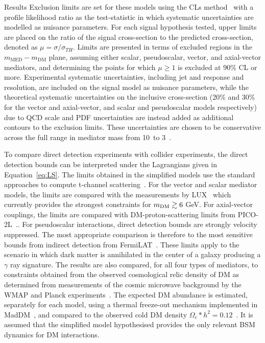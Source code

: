 \begin{section}{Results}
Exclusion limits are set for these models using the CLs method~\cite{cls} with a profile likelihood ratio as the 
test-statistic in which systematic uncertainties are modelled as nuisance parameters. 
For each signal hypothesis tested, upper limits are placed on the ratio of 
the signal cross-section to the predicted cross-section, denoted as $\mu=\sigma/\sigma_{TH}$. Limits are presented in terms of excluded regions in the 
$m_{\mathrm{MED}}-m_{\textrm{DM}}$ plane, assuming either scalar,
pseudoscalar, vector, and axial-vector mediators, and determining the points for which $\mu\ge1$ is excluded at 90\% CL or more.
Experimental systematic uncertainties, including jet and \ETm response and resolution, are included on the signal model as nuisance parameters, while the
theoretical systematic uncertainties on the inclusive cross-section (20\% and 30\% for the vector and axial-vector, and scalar and pseudoscalar models respectively) due to QCD scale and 
PDF uncertainties are instead added as additional contours to the
exclusion limits. These uncertainties are chosen to be conservative
across the full range in mediator mass from 10~\GeV to 3~\TeV.

To compare direct detection experiments with collider experiments, the direct detection bounds can be interpreted under the Lagrangians given in Equation~\ref{eq:LS}. The limits obtained in 
the simplified models use the standard approaches to compute t-channel scattering~\cite{Kurylov:2003ra,Hisano:2010ct, Cheung:2013pfa,Buchmueller:2014yoa}. 
For the vector and scalar mediator models, the limits are compared with the measurements by LUX~\cite{Akerib:2012ys,Akerib:2013tjd,Szydagis:2014xog} which currently 
provides the strongest constraints for $m_{\rm{DM}} \gtrsim 6$ GeV. For axial-vector couplings, the limits are compared with 
DM-proton-scattering limits from PICO-2L~\cite{Amole:2015lsj}..
For pseudoscalar interactions, direct detection bounds are strongly velocity suppressed. 
The most appropriate comparison is therefore to the most sensitive bounds from indirect detection from FermiLAT~\cite{Ackermann:2011wa,Abdo:2010ex}. 
These limits apply to the scenario in which dark matter is annihilated in the center of a galaxy producing a $\gamma$ ray signature. 
The results are also compared, for all four types of mediators, to constraints obtained from the observed cosmological relic density of DM as determined from 
measurements of the cosmic microwave background by the WMAP and Planck experiments~\cite{Bennett:2003ba,Planck:2006aa}. The expected DM abundance is estimated, separately for each
model, using a thermal freeze-out mechanism implemented in MadDM~\cite{Backovic:2013dpa}, and compared to the observed cold DM density $\Omega_c*h^2=0.12$~\cite{Ade:2013zuv}. 
It is assumed that the simplified model hypothesised provides the only relevant BSM dynamics for DM interactions.


\end{section}
